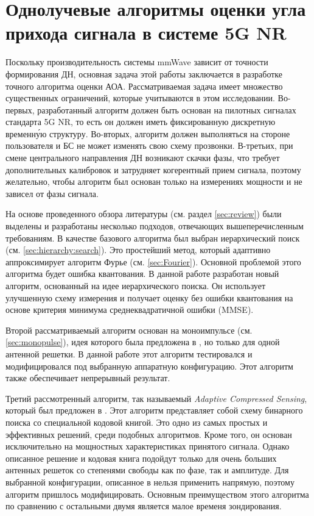 
\section{Однолучевые алгоритмы оценки угла прихода сигнала в системе 5G NR}
\label{sec:singlepath}
Поскольку производительность системы mmWave зависит от точности формирования ДН,
основная задача этой работы заключается в разработке точного алгоритма оценки
АОА. Рассматриваемая задача имеет множество существенных ограничений, которые
учитываются в этом исследовании.  Во-первых, разработанный алгоритм должен быть
основан на пилотных сигналах стандарта 5G NR, то есть он должен иметь
фиксированную дискретную временн\'{у}ю структуру.  Во-вторых,
алгоритм должен выполняться на стороне пользователя и БС не может изменять свою
схему прозвонки. В-третьих, при смене центрального направления ДН возникают
скачки фазы, что требует дополнительных калибровок и затрудняет когерентный
прием сигнала, поэтому желательно, чтобы алгоритм был основан только на
измерениях мощности и не зависел от фазы сигнала.

На основе проведенного обзора литературы (см. раздел \ref{sec:review})
были выделены и разработаны несколько подходов, отвечающих вышеперечисленным
требованиям. В качестве базового алгоритма был выбран
иерархический поиск (см.  \ref{sec:hierarchy:search}).  Это простейший метод,
который адаптивно аппроксимирует алгоритм Фурье (см. \ref{sec:Fourier}).
Основной проблемой этого алгоритма будет ошибка квантования.  В данной работе
разработан новый алгоритм, основанный на идее иерархического поиска.  Он
использует улучшенную схему измерения и получает оценку без ошибки квантования
на основе критерия минимума среднеквадратичной ошибки (MMSE).

Второй рассматриваемый алгоритм основан на моноимпульсе (см.
\ref{sec:monopulse}), идея которого была предложена в \cite{Zhu2016, Kim2019},
но только для одной антенной решетки. В данной работе этот алгоритм тестировался
и модифицировался под выбранную аппаратную конфигурацию.  Этот алгоритм также
обеспечивает непрерывный результат.

Третий рассмотренный алгоритм, так называемый \textit{Adaptive Compressed
    Sensing}, который был предложен в \cite{Alkhateeb2014}.  Этот алгоритм
представляет собой схему бинарного поиска со специальной кодовой книгой. Это
одно из самых простых и эффективных решений, среди подобных алгоритмов.  Кроме
того, он основан исключительно на мощностных характеристиках принятого сигнала.
Однако описанное решение и кодовая книга подойдут только для очень больших
антенных решеток со степенями свободы как по фазе, так и амплитуде. Для
выбранной конфигурации, описанное в \cite{Alkhateeb2014} нельзя применить
напрямую, поэтому алгоритм пришлось модифицировать.  Основным преимуществом
этого алгоритма по сравнению с остальными двумя является малое временя зондирования.

